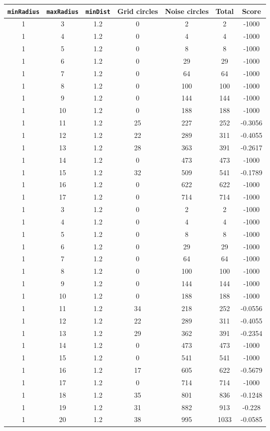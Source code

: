 \documentclass[letterpaper, 12pt]{article}
\begin{document}
\begin{longtable}{|c|c|c|c|c|c|c|}
\hline
\textbf{\texttt{minRadius}} & \textbf{\texttt{maxRadius}} & \textbf{\texttt{minDist}} & \textbf{Grid circles} & \textbf{Noise circles} & \textbf{Total} & \textbf{Score} \\
\hline
1 & 3 & 1.2 & 0 & 2 & 2 & -1000 \\
\hline
1 & 4 & 1.2 & 0 & 4 & 4 & -1000 \\
\hline
1 & 5 & 1.2 & 0 & 8 & 8 & -1000 \\
\hline
1 & 6 & 1.2 & 0 & 29 & 29 & -1000 \\
\hline
1 & 7 & 1.2 & 0 & 64 & 64 & -1000 \\
\hline
1 & 8 & 1.2 & 0 & 100 & 100 & -1000 \\
\hline
1 & 9 & 1.2 & 0 & 144 & 144 & -1000 \\
\hline
1 & 10 & 1.2 & 0 & 188 & 188 & -1000 \\
\hline
1 & 11 & 1.2 & 25 & 227 & 252 & -0.3056 \\
\hline
1 & 12 & 1.2 & 22 & 289 & 311 & -0.4055 \\
\hline
1 & 13 & 1.2 & 28 & 363 & 391 & -0.2617 \\
\hline
1 & 14 & 1.2 & 0 & 473 & 473 & -1000 \\
\hline
1 & 15 & 1.2 & 32 & 509 & 541 & -0.1789 \\
\hline
1 & 16 & 1.2 & 0 & 622 & 622 & -1000 \\
\hline
1 & 17 & 1.2 & 0 & 714 & 714 & -1000 \\
\hline
1 & 3 & 1.2 & 0 & 2 & 2 & -1000 \\
\hline
1 & 4 & 1.2 & 0 & 4 & 4 & -1000 \\
\hline
1 & 5 & 1.2 & 0 & 8 & 8 & -1000 \\
\hline
1 & 6 & 1.2 & 0 & 29 & 29 & -1000 \\
\hline
1 & 7 & 1.2 & 0 & 64 & 64 & -1000 \\
\hline
1 & 8 & 1.2 & 0 & 100 & 100 & -1000 \\
\hline
1 & 9 & 1.2 & 0 & 144 & 144 & -1000 \\
\hline
1 & 10 & 1.2 & 0 & 188 & 188 & -1000 \\
\hline
1 & 11 & 1.2 & 34 & 218 & 252 & -0.0556 \\
\hline
1 & 12 & 1.2 & 22 & 289 & 311 & -0.4055 \\
\hline
1 & 13 & 1.2 & 29 & 362 & 391 & -0.2354 \\
\hline
1 & 14 & 1.2 & 0 & 473 & 473 & -1000 \\
\hline
1 & 15 & 1.2 & 0 & 541 & 541 & -1000 \\
\hline
1 & 16 & 1.2 & 17 & 605 & 622 & -0.5679 \\
\hline
1 & 17 & 1.2 & 0 & 714 & 714 & -1000 \\
\hline
1 & 18 & 1.2 & 35 & 801 & 836 & -0.1248 \\
\hline
1 & 19 & 1.2 & 31 & 882 & 913 & -0.228 \\
\hline
1 & 20 & 1.2 & 38 & 995 & 1033 & -0.0585 \\
\hline
\end{longtable}
\end{document}
